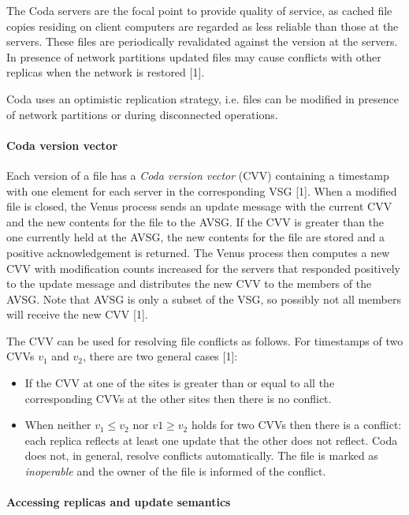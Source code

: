 The Coda servers are the focal point to provide quality of service, as cached file copies residing on client computers are regarded as less reliable than those at the servers. These files are periodically revalidated against the version at the servers. In presence of network partitions updated files may cause conflicts with other replicas when the network is restored [1].

Coda uses an optimistic replication strategy, i.e. files can be modified in presence of network partitions or during disconnected operations.


\paragraph{Coda version vector}

Each version of a file has a \emph{Coda version vector} (CVV) containing a timestamp with one element for each server in the corresponding VSG [1]. When a modified file is closed, the Venus process sends an update message with the current CVV and the new contents for the file to the AVSG. If the CVV is greater than the one currently held at the AVSG, the new contents for the file are stored and a positive acknowledgement is returned. The Venus process then computes a new CVV with modification counts increased for the servers that responded positively to the update message and distributes the new CVV to the members of the AVSG. Note that AVSG is only a subset of the VSG, so possibly not all members will receive the new CVV [1].

The CVV can be used for resolving file conflicts as follows. For timestamps of two CVVs $v_{1}$ and $v_{2}$, there are two general cases [1]:
\begin{itemize}
	\item If the CVV at one of the sites is greater than or equal to all the corresponding CVVs at the other sites then there is no conflict.
	\item When neither $v_{1} \leq v_{2}$ nor $v{1} \geq v_{2}$ holds for two CVVs then there is a conflict: each replica reflects at least one update that the other does not reflect. Coda does not, in general, resolve conflicts automatically. The file is marked as \emph{inoperable} and the owner of the file is informed of the conflict.
\end{itemize}



\paragraph{Accessing replicas and update semantics}


